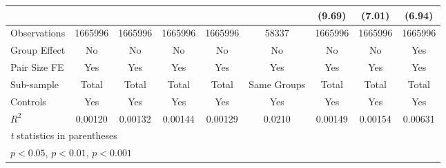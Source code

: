 {\begin{tabular}{l*{8}{c}}
                &                  &                  &                  &                  &                  &   (9.69)         &   (7.01)         &   (6.94)         \\
\hline
Observations    &  1665996         &  1665996         &  1665996         &  1665996         &    58337         &  1665996         &  1665996         &  1665996         \\
Group Effect    &       No         &       No         &       No         &       No         &       No         &       No         &       No         &      Yes         \\
Pair Size FE    &      Yes         &      Yes         &      Yes         &      Yes         &      Yes         &      Yes         &      Yes         &      Yes         \\
Sub-sample      &    Total         &    Total         &    Total         &    Total         &Same Groups         &    Total         &    Total         &    Total         \\
Controls        &      Yes         &      Yes         &      Yes         &      Yes         &      Yes         &      Yes         &      Yes         &      Yes         \\
$ R^2 $         &  0.00120         &  0.00132         &  0.00144         &  0.00129         &   0.0210         &  0.00149         &  0.00154         &  0.00631         \\
\hline\hline
\multicolumn{9}{l}{\footnotesize \textit{t} statistics in parentheses}\\
\multicolumn{9}{l}{\footnotesize \sym{*} \(p<0.05\), \sym{**} \(p<0.01\), \sym{***} \(p<0.001\)}\\
\end{tabular}
}
